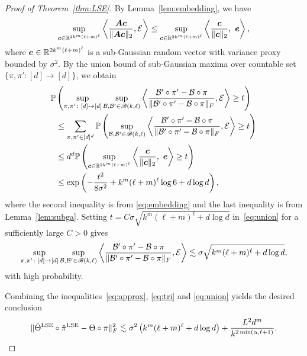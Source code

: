 \documentclass[12pt]{article}
\theoremstyle{definition}
\def\caliB{\mathscr{B}}
\begin{document}
\begin{proof}[Proof of Theorem~\ref{thm:LSE}]
By Lemma~\ref{lem:embedding}, we have 
\begin{align}\label{eq:embedding}
\sup_{\mc\in \bbR^{2k^m(\ell+m)^\ell}}\left\langle {\mA\mc \over \vnormSize{}{\mA\mc}}, \tE \right \rangle \leq \sup_{\mc\in \bbR^{2k^m(\ell+m)^\ell } }\left\langle {\mc\over \vnormSize{}{\mc}},\ \me \right\rangle,
\end{align}
where $\bm{e}\in\mathbb{R}^{2k^m(\ell+m)^\ell}$ is a sub-Gaussian random vector with variance proxy bounded by $\sigma^2$. 
By the union bound of sub-Gaussian maxima over countable set $\{\pi,\pi'\colon [d]\to[d]\}$, we obtain
\begin{align}\label{eq:union}
    \mathbb{P}&\left(\sup_{\pi, \pi'\colon[d]\to[d]}\sup_{\tB, \tB'\in \caliB(k,\ell)} \left\langle {\tB'\circ \pi'-\tB\circ \pi \over \FnormSize{}{\tB'\circ \pi'-\tB\circ \pi}}, \tE \right \rangle\geq t\right)\notag \\
    &\leq \sum_{\pi,\pi'\in[d]^d}\mathbb{P}\left(\sup_{\tB, \tB'\in \caliB(k,\ell)} \left\langle {\tB'\circ \pi'-\tB\circ \pi \over \FnormSize{}{\tB'\circ \pi'-\tB\circ \pi}}, \tE \right \rangle\geq t\right)\notag \\
    &\leq d^d\mathbb{P}\left( \sup_{\mc\in \bbR^{2k^m(\ell+m)^\ell } }\left\langle {\mc\over \vnormSize{}{\mc}},\ \me \right\rangle\geq t\right)\notag\\
    &\leq \exp\left(-\frac{t^2}{8\sigma^2} +k^m(\ell+m)^\ell\log 6 + d\log d\right),
\end{align}
where the second inequality is from \eqref{eq:embedding} and the last inequality is from Lemma~\ref{lem:subga}. Setting $t = C\sigma\sqrt{k^m(\ell+m)^\ell + d\log d}$ in~\eqref{eq:union} for a sufficiently large $C>0$ gives
\begin{align}
    \sup_{\pi, \pi'\colon[d]\to[d]}\sup_{\tB, \tB'\in \caliB(k,\ell)} \left\langle {\tB'\circ \pi'-\tB\circ \pi \over \FnormSize{}{\tB'\circ \pi'-\tB\circ \pi}}, \tE \right \rangle\lesssim \sigma\sqrt{k^m(\ell+m)^\ell +d\log d},
\end{align}
with high probability.

Combining the inequalities~\eqref{eq:approx}, \eqref{eq:tri} and \eqref{eq:union} yields the desired conclusion
\begin{equation}\label{eq:three}
\lVert\hat\Theta^\textup{LSE}\circ\hat\pi^\textup{LSE} -\Theta\circ \pi\rVert_F^2\lesssim \sigma^2\left(k^m(\ell+m)^\ell +d\log d\right)+{L^2d^m \over k^{2\min(\alpha, \ell+1)}} .
\end{equation}


\end{proof}
\end{document}
